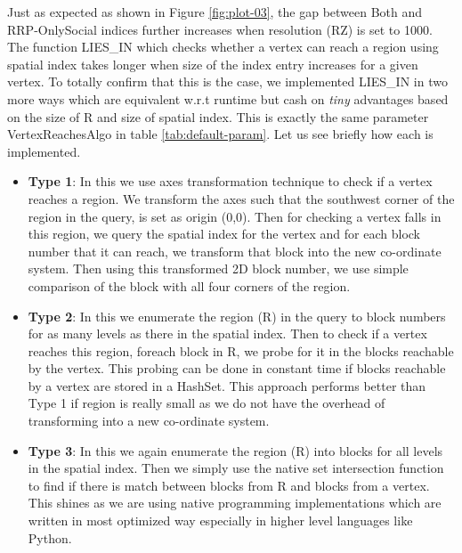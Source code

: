 Just as expected as shown in Figure \ref{fig:plot-03}, the gap between Both and RRP-OnlySocial indices further increases when resolution (RZ) is set to 1000. The function LIES\_IN which checks whether a vertex can reach a region using spatial index takes longer when size of the index entry increases for a given vertex. To totally confirm that this is the case, we implemented LIES\_IN in two more ways which are equivalent w.r.t runtime but cash on \textit{tiny} advantages based on the size of R and size of spatial index. This is exactly the same parameter VertexReachesAlgo in table \ref{tab:default-param}. Let us see briefly how each is implemented.
\begin{itemize}
  \item \textbf{Type 1}: In this we use axes transformation technique to check if a vertex reaches a region. We transform the axes such that the southwest corner of the region in the query, is set as origin (0,0). Then for checking a vertex falls in this region, we query the spatial index for the vertex and for each block number that it can reach, we transform that block into the new co-ordinate system. Then using this transformed 2D block number, we use simple comparison of the block with all four corners of the region.
  \item \textbf{Type 2}: In this we enumerate the region (R) in the query to block numbers for as many levels as there in the spatial index. Then to check if a vertex reaches this region, foreach block in R, we probe for it in the blocks reachable by the vertex. This probing can be done in constant time if blocks reachable by a vertex are stored in a HashSet. This approach performs better than Type 1 if region is really small as we do not have the overhead of transforming into a new co-ordinate system.
  \item \textbf{Type 3}: In this we again enumerate the region (R) into blocks for all levels in the spatial index. Then we simply use the native set intersection function to find if there is match between blocks from R and blocks from a vertex. This shines as we are using native programming implementations which are written in most optimized way especially in higher level languages like Python.
\end{itemize}



